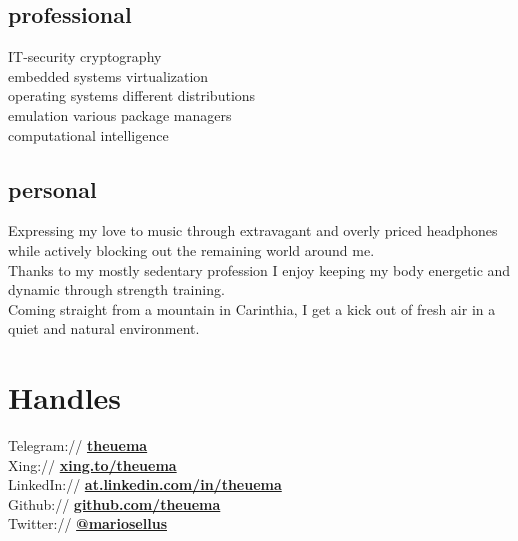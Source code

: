 \documentclass[]{resume}
\begin{document}
\begin{minipage}[t]{0.33\textwidth}
	\subsection{professional}
	IT-security \textbullet{} cryptography\\
	embedded systems \textbullet{} virtualization\\
	operating systems \textbullet{} different distributions\\
	emulation \textbullet{} various package managers\\
	computational intelligence
	\sectionsep

	\subsection{personal}
	Expressing my love to music through extravagant and overly priced headphones while actively blocking out the remaining world around me. \\ \sectionsep
	Thanks to my mostly sedentary profession I enjoy keeping my body energetic and dynamic through strength training. \\ \sectionsep 
	Coming straight from a mountain in Carinthia, I get a kick out of fresh air in a quiet and natural environment. 
	\sectionsep
\section{Handles} 
	Telegram:// \href{https://telegram.me/theuema}{\textbf{theuema}} \\ \smallsep 
	Xing:// \href{https://www.xing.com/profile/Mario_Theuermann}{\textbf{xing.to/theuema}} \\ \smallsep 
	LinkedIn:// \href{https://www.linkedin.com/in/theuema}{\textbf{at.linkedin.com/in/theuema}} \\ \smallsep 
	Github:// \href{https://github.com/theuema}{\textbf{github.com/theuema}} \\ \smallsep 
	Twitter:// \href{https://twitter.com/mariosellus}{\textbf{@mariosellus}} \\ \smallsep 

\end{minipage}\quad %
\end{document}
